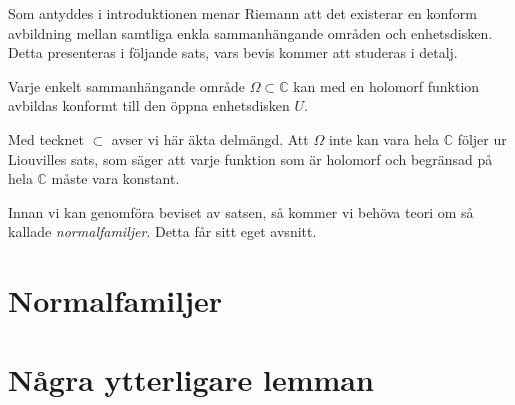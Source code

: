 \documentclass{article}
\begin{document}


Som antyddes i introduktionen menar Riemann att det existerar en konform avbildning mellan samtliga enkla sammanhängande områden och enhetsdisken. Detta presenteras i följande sats, vars bevis kommer att studeras i detalj.
\begin{theorem}
	Varje enkelt sammanhängande område $\Omega \subset \mathbb{C}$ kan med en holomorf funktion avbildas konformt till den öppna enhetsdisken $U$.
\end{theorem}

\begin{remark}
	Med tecknet $\subset$ avser vi här äkta delmängd. Att $\Omega$ inte kan vara hela $\mathbb{C}$ följer ur Liouvilles sats, som säger att varje funktion som är holomorf och begränsad på hela $\mathbb{C}$ måste vara konstant.
\end{remark}

Innan vi kan genomföra beviset av satsen, så kommer vi behöva teori om så kallade \emph{normalfamiljer}. Detta får sitt eget avsnitt.


\section{Normalfamiljer}


\section{Några ytterligare lemman}

\end{document}
